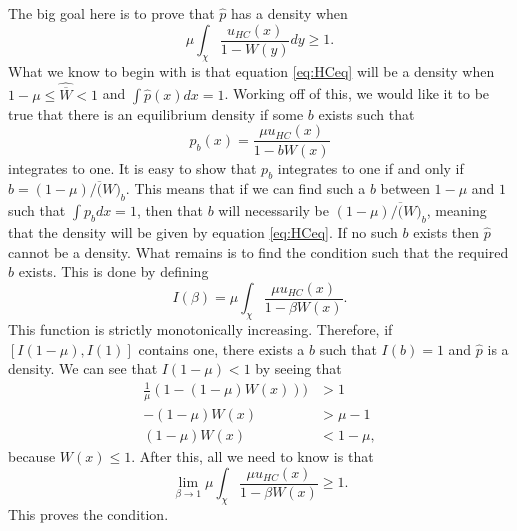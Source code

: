 The big goal here is to prove that $\hat{p}$ has a density when 
\begin{equation}
\mu \int_{\chi}\frac{u_{HC}(x)}{1-W(y)}dy \geq 1.
\end{equation}
What we know to begin with is that equation \ref{eq:HCeq} will be a density when $1-\mu \leq \hat{\overline{W}} < 1$ and 
$\int \hat{p}(x)dx = 1$. Working off of this, we would like it to be true that there is an equilibrium density if some $b$ 
exists such that 
\begin{equation}
p_b(x) = \frac{\mu u_{HC}(x)}{1-bW(x)}
\end{equation}
integrates to one. It is easy to show that $p_b$ integrates to one if and only if $b=(1-\mu)/\overline(W)_b$. This means
that if we can find such a $b$ between $1-\mu$ and $1$ such that $\int p_b dx=1$, then that $b$ will necessarily be
$(1-\mu)/\overline(W)_b$, meaning that the density will be given by equation \ref{eq:HCeq}. If no such $b$ exists then
$\hat{p}$ cannot be a density. What remains is to find the condition such that the required $b$ exists. This is done by 
defining 
\begin{equation}
I(\beta) = \mu \int_{\chi}\frac{\mu u_{HC}(x)}{1-\beta W(x)}.
\end{equation}
This function is strictly monotonically increasing. Therefore, if $[I(1-\mu),I(1)]$ contains one, there exists a $b$ such 
that $I(b)=1$ and $\hat{p}$ is a density. We can see that $I(1-\mu)<1$ by seeing that 
\begin{align}
\frac{1}{\mu}(1-(1-\mu)W(x))) &> 1 \nonumber \\
-(1-\mu)W(x) &> \mu - 1 \nonumber \\
(1-\mu)W(x) &< 1-\mu, 
\end{align}
because $W(x) \leq 1$. After this, all we need to know is that 
\begin{equation}
\lim_{\beta \to 1} \mu \int_{\chi}\frac{\mu u_{HC}(x)}{1-\beta W(x)} \geq 1.
\end{equation}
This proves the condition. 
